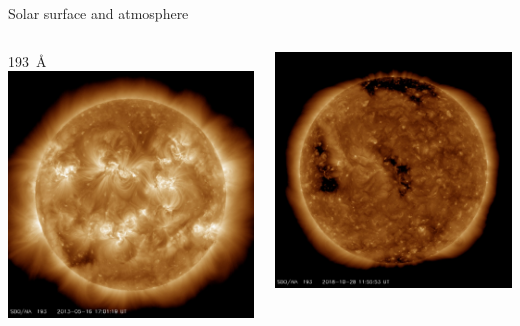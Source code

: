 \begin{frame}[plain,c,label=wavelengths]{Solar surface and atmosphere}{}
\begin{columns}[c]
	
		\centering \small \SI{193}{\AA} \color{white}{g}
		\includegraphics[width=\textwidth]{../talk_figures/20130516_170119_1024_0193.jpg}
		
		\includegraphics[width=\textwidth]{../talk_figures/20181028_115553_1024_0193.jpg}
		
	\end{columns}
\end{frame}

